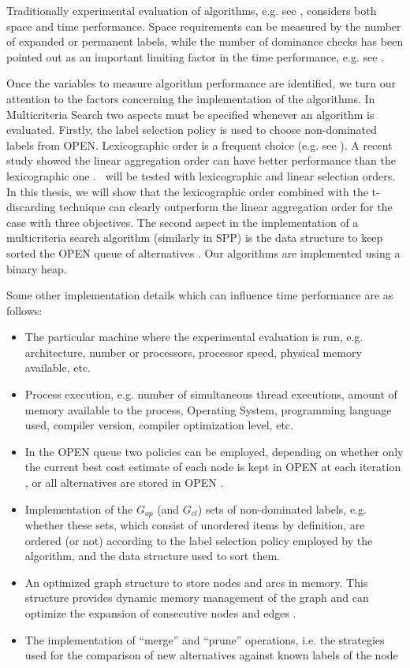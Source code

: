 Traditionally experimental evaluation of algorithms, e.g. see \citep{Raith2009,Sauvanet2010}, considers both space and time performance. Space requirements can be measured by the number of expanded or permanent labels, while the number of dominance checks has been pointed out as an important limiting factor in the time performance, e.g. see \citep{Iori2010,Machuca2011}.

Once the variables to measure algorithm performance are identified, we turn our attention to the factors concerning the implementation of the algorithms. In Multicriteria Search two aspects must be specified whenever an algorithm is evaluated. Firstly, the label selection policy is used to choose non-dominated labels from OPEN. Lexicographic order is a frequent choice (e.g. see \citep{Martins1984}). A recent study showed the linear aggregation order can have better performance than the lexicographic one \citep{Iori2010}. \namoa \ will be tested with lexicographic and linear selection orders. In this thesis, we will show that the lexicographic order combined with the t-discarding technique can clearly outperform the linear aggregation order for the case with three objectives. The second aspect in the implementation of a multicriteria search algorithm (similarly in SPP) is the data structure to keep sorted the OPEN queue of alternatives \citep{Paixao2007}. Our algorithms are implemented using a binary heap.

Some other implementation details which can influence time performance are as follows:

\begin{itemize}
	\item The particular machine where the experimental evaluation is run, e.g. architecture, number or processors, processor speed, physical memory available, etc.
	\item Process execution, e.g. number of simultaneous thread executions, amount of memory available to the process, Operating System, programming language used, compiler version, compiler optimization level, etc.
    \item In the OPEN queue two policies can be employed, depending on whether only the current best cost estimate of each node is kept in OPEN at each iteration \citet{Mandow2005}, or all alternatives are stored in OPEN \citep{Mali2012}.
    \item Implementation of the $G_{op}$ (and $G_{cl}$) sets of non-dominated labels, e.g. whether these sets, which consist of unordered items by definition, are ordered (or not) according to the label selection policy employed by the algorithm, and the data structure used to sort them.
    \item An optimized graph structure to store nodes and arcs in memory. This structure provides dynamic memory management of the graph and can optimize the expansion of consecutive nodes and edges \citep{Mali2013}.
    \item The implementation of ``merge''  and ``prune'' operations, i.e. the strategies used for the comparison of new alternatives against known labels of the node  \citep{skriverandersen2000,Raith2009,Iori2010}
\end{itemize}

